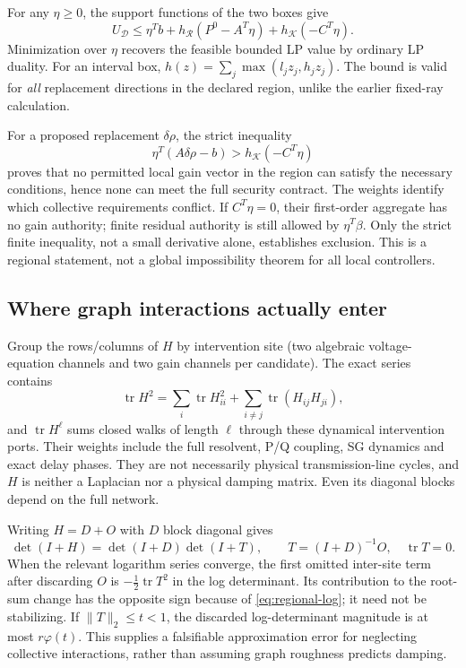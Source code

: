 For any $\eta\ge0$, the support functions of the two boxes give
\begin{equation}
 U_{\mathcal D}\le
 \eta^Tb+h_{\mathcal R}(P^0-A^T\eta)
          +h_{\mathcal K}(-C^T\eta). \label{eq:regionaldual}
\end{equation}
Minimization over $\eta$ recovers the feasible bounded LP value
by ordinary LP duality. For an interval box,
$h(z)=\sum_j\max(l_jz_j,h_jz_j)$.
The bound is valid for \emph{all} replacement directions in the
declared region, unlike the earlier fixed-ray calculation.

For a proposed replacement $\delta\rho$, the strict inequality
\begin{equation}
 \eta^T(A\delta\rho-b)>h_{\mathcal K}(-C^T\eta)
 \label{eq:regional-exclusion}
\end{equation}
proves that no permitted local gain vector in the region can satisfy
the necessary conditions, hence none can meet the full security contract.
The weights identify which collective requirements conflict.
If $C^T\eta=0$, their first-order aggregate has no gain authority;
finite residual authority is still allowed by $\eta^T\beta$.
Only the strict finite inequality, not a small derivative alone,
establishes exclusion. This is a regional statement, not a global
impossibility theorem for all local controllers.

\subsection{Where graph interactions actually enter}
Group the rows/columns of $H$ by intervention site (two algebraic
voltage-equation channels and two gain channels per candidate).
The exact series contains
\[
 \operatorname{tr}H^2
 =\sum_i\operatorname{tr}H_{ii}^2
   +\sum_{i\ne j}\operatorname{tr}(H_{ij}H_{ji}),
\]
and $\operatorname{tr}H^\ell$ sums closed walks of length $\ell$
through these dynamical intervention ports. Their weights include
the full resolvent, P/Q coupling, SG dynamics and exact delay phases.
They are not necessarily physical transmission-line cycles, and $H$
is neither a Laplacian nor a physical damping matrix.
Even its diagonal blocks depend on the full network.

Writing $H=D+O$ with $D$ block diagonal gives
\[
 \det(I+H)=\det(I+D)\det(I+T),\qquad T=(I+D)^{-1}O,\quad
 \operatorname{tr}T=0.
\]
When the relevant logarithm series converge, the first omitted
inter-site term after discarding $O$ is
$-\tfrac12\operatorname{tr}T^2$ in the log determinant.
Its contribution to the root-sum change has the opposite sign
because of \eqref{eq:regional-log}; it need not be stabilizing.
If $\|T\|_2\le t<1$, the discarded log-determinant magnitude is
at most $r\varphi(t)$.
This supplies a falsifiable approximation error for neglecting
collective interactions, rather than assuming graph roughness
predicts damping.

